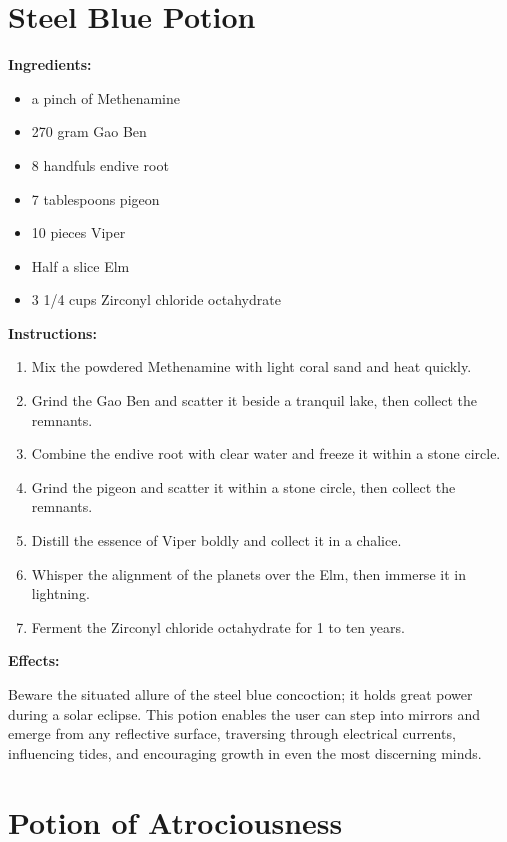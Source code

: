\documentclass{article}
\begin{document}
\newpage
\section*{Steel Blue Potion}

\textbf{Ingredients:}

\begin{itemize}
  \item a pinch of Methenamine
  \item 270 gram Gao Ben
  \item 8 handfuls endive root
  \item 7 tablespoons pigeon
  \item 10 pieces Viper
  \item Half a slice Elm
  \item 3 1/4 cups Zirconyl chloride octahydrate
\end{itemize}

\textbf{Instructions:}

\begin{enumerate}
  \item Mix the powdered Methenamine with light coral sand and heat quickly.
  \item Grind the Gao Ben and scatter it beside a tranquil lake, then collect the remnants.
  \item Combine the endive root with clear water and freeze it within a stone circle.
  \item Grind the pigeon and scatter it within a stone circle, then collect the remnants.
  \item Distill the essence of Viper boldly and collect it in a chalice.
  \item Whisper the alignment of the planets over the Elm, then immerse it in lightning.
  \item Ferment the Zirconyl chloride octahydrate for 1 to ten years.
\end{enumerate}

\textbf{Effects:}

Beware the situated allure of the steel blue concoction; it holds great power during a solar eclipse. This potion enables the user can step into mirrors and emerge from any reflective surface, traversing through electrical currents, influencing tides, and encouraging growth in even the most discerning minds.

\newpage
\section*{Potion of Atrociousness}
\end{document}
